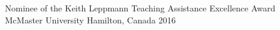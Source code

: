 



\begin{cvhonors}

  \cvhonor
    {Nominee of the Keith Leppmann Teaching Assistance Excellence Award} %
    {McMaster University} %
    {Hamilton, Canada} %
    {2016} %



\end{cvhonors}







